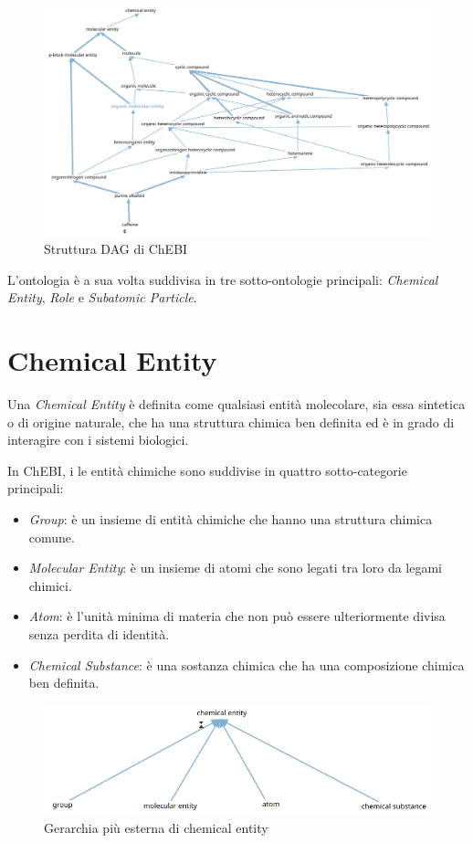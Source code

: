 \documentclass[12pt,a4paper,openright,twoside]{book}
\begin{document}
\begin{figure}[H]
	\centering
	\includegraphics[width=\linewidth]{figures/caffeine.png}
	\caption{Struttura DAG di ChEBI}
	\label{fig:Caffeine}
\end{figure}

L'ontologia è a sua volta suddivisa in tre sotto-ontologie principali: \textit{Chemical Entity}, \textit{Role} e \textit{Subatomic Particle}.

\section{Chemical Entity}

Una \textit{Chemical Entity} è definita come qualsiasi entità molecolare, sia essa sintetica o di origine naturale, che ha una struttura chimica ben definita ed è in grado di interagire con i sistemi biologici.

In ChEBI, i le entità chimiche sono suddivise in quattro sotto-categorie principali:
\begin{itemize}
	\item \textit{Group}: è un insieme di entità chimiche che hanno una struttura chimica comune.
	\item \textit{Molecular Entity}: è un insieme di atomi che sono legati tra loro da legami chimici.
	\item \textit{Atom}: è l'unità minima di materia che non può essere ulteriormente divisa senza perdita di identità.
	\item \textit{Chemical Substance}: è una sostanza chimica che ha una composizione chimica ben definita.
\end{itemize}


\begin{figure}[H]
	\centering
	\includegraphics[width=\linewidth]{figures/chemical-entity.png}
	\caption{Gerarchia più esterna di chemical entity}
	\label{fig:ChemicalEntity}
\end{figure}
\end{document}
